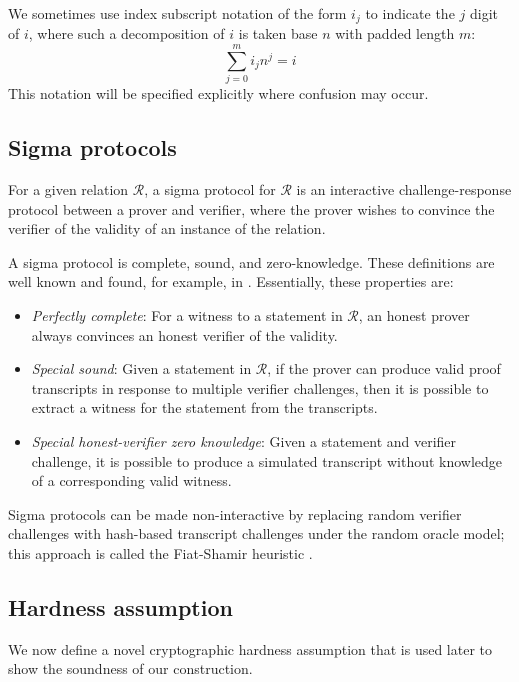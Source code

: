 \documentclass{article}
\theoremstyle{definition}
\begin{document}
We sometimes use index subscript notation of the form $i_j$ to indicate the $j$ digit of $i$, where such a decomposition of $i$ is taken base $n$ with padded length $m$:
$$\sum_{j=0}^m i_j n^j = i$$
This notation will be specified explicitly where confusion may occur.


\subsection{Sigma protocols}
For a given relation $\mathcal{R}$, a sigma protocol for $\mathcal{R}$ is an interactive challenge-response protocol between a prover and verifier, where the prover wishes to convince the verifier of the validity of an instance of the relation.

A sigma protocol is complete, sound, and zero-knowledge.
These definitions are well known and found, for example, in \cite{groth}.
Essentially, these properties are:
\begin{itemize}
\item \textit{Perfectly complete}: For a witness to a statement in $\mathcal{R}$, an honest prover always convinces an honest verifier of the validity.
\item \textit{Special sound}: Given a statement in $\mathcal{R}$, if the prover can produce valid proof transcripts in response to multiple verifier challenges, then it is possible to extract a witness for the statement from the transcripts.
\item \textit{Special honest-verifier zero knowledge}: Given a statement and verifier challenge, it is possible to produce a simulated transcript without knowledge of a corresponding valid witness.
\end{itemize}
Sigma protocols can be made non-interactive by replacing random verifier challenges with hash-based transcript challenges under the random oracle model; this approach is called the Fiat-Shamir heuristic \cite{fiat}.


\subsection{Hardness assumption}
We now define a novel cryptographic hardness assumption that is used later to show the soundness of our construction.
\end{document}
